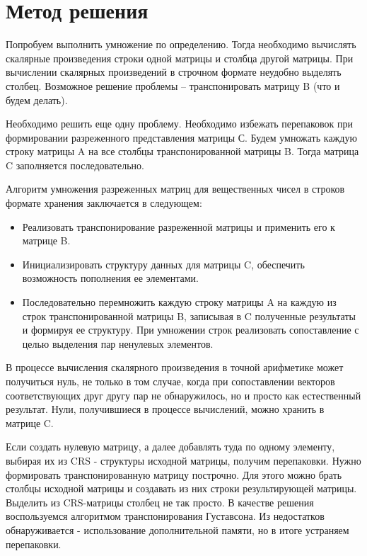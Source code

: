 \documentclass{report}
\begin{document}
\section*{Метод решения}
Попробуем выполнить умножение по определению. Тогда необходимо вычислять скалярные произведения строки одной матрицы и столбца другой матрицы. При вычислении скалярных произведений в строчном формате неудобно выделять столбец. Возможное решение проблемы – транспонировать матрицу B (что и будем делать).
\par Необходимо решить еще одну проблему. Необходимо избежать перепаковок при формировании разреженного представления матрицы С. Будем умножать каждую строку матрицы A на все столбцы транспонированной матрицы B. Тогда матрица C заполняется последовательно.
\par Алгоритм умножения разреженных матриц для вещественных чисел в строков формате хранения заключается в следующем:
\begin{itemize}
\item Реализовать транспонирование разреженной матрицы и применить его к матрице B.
\item Инициализировать структуру данных для матрицы C, обеспечить возможность пополнения ее элементами.
\item Последовательно перемножить каждую строку матрицы A на каждую из строк транспонированной матрицы B, записывая в C полученные результаты и формируя ее структуру. При умножении строк реализовать сопоставление с целью выделения пар ненулевых элементов.
\end{itemize}
\par В процессе вычисления скалярного произведения в точной арифметике может получиться нуль, не только в том случае, когда при сопоставлении векторов соответствующих друг другу пар не обнаружилось, но и просто как естественный результат. Нули, получившиеся в процессе вычислений, можно хранить в матрице C.
\par Если создать нулевую матрицу, а далее добавлять туда по одному элементу, выбирая их из CRS - структуры исходной матрицы, получим перепаковки. Нужно формировать транспонированную матрицу построчно. Для этого можно брать столбцы исходной матрицы и создавать из них строки результирующей матрицы. Выделить из CRS-матрицы столбец не так просто. В качестве решения воспользуемся алгоритмом транспонирования Густавсона. Из недостатков обнаруживается - использование дополнительной памяти, но в итоге устраняем перепаковки.
\newpage
\end{document}
